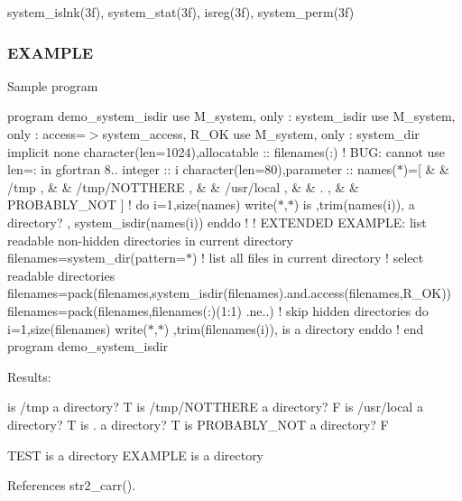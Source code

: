 system\+\_\+islnk(3f), system\+\_\+stat(3f), isreg(3f), system\+\_\+perm(3f)

\subsubsection*{E\+X\+A\+M\+P\+LE}

Sample program

program demo\+\_\+system\+\_\+isdir use M\+\_\+system, only \+: system\+\_\+isdir use M\+\_\+system, only \+: access=$>$system\+\_\+access, R\+\_\+\+OK use M\+\_\+system, only \+: system\+\_\+dir implicit none character(len=1024),allocatable \+:\+: filenames(\+:) ! B\+UG\+: cannot use len=\+: in gfortran 8.. integer \+:\+: i character(len=80),parameter \+:\+: names($\ast$)=\mbox{[} \& \& \textquotesingle{}/tmp \textquotesingle{}, \& \& \textquotesingle{}/tmp/\+N\+O\+T\+T\+H\+E\+RE \textquotesingle{}, \& \& \textquotesingle{}/usr/local \textquotesingle{}, \& \& \textquotesingle{}. \textquotesingle{}, \& \& \textquotesingle{}P\+R\+O\+B\+A\+B\+L\+Y\+\_\+\+N\+OT \textquotesingle{}\mbox{]} ! do i=1,size(names) write($\ast$,$\ast$)\textquotesingle{} is \textquotesingle{},trim(names(i)),\textquotesingle{} a directory? \textquotesingle{}, system\+\_\+isdir(names(i)) enddo ! ! E\+X\+T\+E\+N\+D\+ED E\+X\+A\+M\+P\+LE\+: list readable non-\/hidden directories in current directory filenames=system\+\_\+dir(pattern=\textquotesingle{}$\ast$\textquotesingle{}) ! list all files in current directory ! select readable directories filenames=pack(filenames,system\+\_\+isdir(filenames).and.\+access(filenames,\+R\+\_\+\+O\+K)) filenames=pack(filenames,filenames(\+:)(1\+:1) .ne.\textquotesingle{}.\textquotesingle{}) ! skip hidden directories do i=1,size(filenames) write($\ast$,$\ast$)\textquotesingle{} \textquotesingle{},trim(filenames(i)),\textquotesingle{} is a directory\textquotesingle{} enddo ! end program demo\+\_\+system\+\_\+isdir

Results\+:

is /tmp a directory? T is /tmp/\+N\+O\+T\+T\+H\+E\+RE a directory? F is /usr/local a directory? T is . a directory? T is P\+R\+O\+B\+A\+B\+L\+Y\+\_\+\+N\+OT a directory? F

T\+E\+ST is a directory E\+X\+A\+M\+P\+LE is a directory 

References str2\+\_\+carr().

